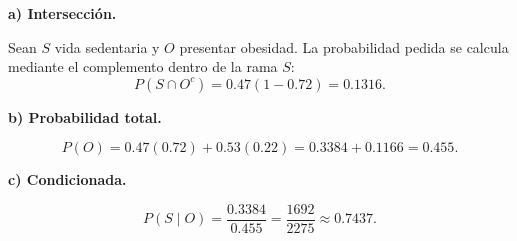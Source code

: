 \textbf{a) Intersección.}\par\nopagebreak[4]
Sean $S$ vida sedentaria y $O$ presentar obesidad. La probabilidad pedida se calcula mediante el complemento dentro de la rama $S$:
\[
\boxed{P(S\cap O^c)=0.47(1-0.72)=0.1316.}
\]

\textbf{b) Probabilidad total.}\par\nopagebreak[4]
\[
\boxed{P(O)=0.47(0.72)+0.53(0.22)=0.3384+0.1166=0.455.}
\]

\textbf{c) Condicionada.}\par\nopagebreak[4]
\[
\boxed{P(S\mid O)=\frac{0.3384}{0.455}=\frac{1692}{2275}\approx0.7437.}
\]
